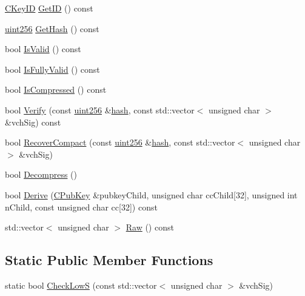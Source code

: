\begin{DoxyCompactItemize}
\item 
\hyperlink{class_c_key_i_d}{C\+Key\+I\+D} \hyperlink{class_c_pub_key_a9c1908fef34fd9e1c4b5e0ffd5d3834e}{Get\+I\+D} () const 
\item 
\hyperlink{classuint256}{uint256} \hyperlink{class_c_pub_key_a85b5eaf92b26cb4a230586050285c3f4}{Get\+Hash} () const 
\item 
bool \hyperlink{class_c_pub_key_aad6f369d7972f2244466ca6db900c2a4}{Is\+Valid} () const 
\item 
bool \hyperlink{class_c_pub_key_a2533ec5fc9a1c3d2ef39d0faa3ad6cdd}{Is\+Fully\+Valid} () const 
\item 
bool \hyperlink{class_c_pub_key_a397e437d9d0a008e2641892147b0931a}{Is\+Compressed} () const 
\item 
bool \hyperlink{class_c_pub_key_ab4047c7ce31b72591d8108a2563cd21b}{Verify} (const \hyperlink{classuint256}{uint256} \&\hyperlink{cache_8cc_a11ecb029164e055f28f4123ce3748862}{hash}, const std\+::vector$<$ unsigned char $>$ \&vch\+Sig) const 
\item 
bool \hyperlink{class_c_pub_key_a169505e735a02db385486b0affeb565c}{Recover\+Compact} (const \hyperlink{classuint256}{uint256} \&\hyperlink{cache_8cc_a11ecb029164e055f28f4123ce3748862}{hash}, const std\+::vector$<$ unsigned char $>$ \&vch\+Sig)
\item 
bool \hyperlink{class_c_pub_key_a572689418fecf47b300a11519bc3da36}{Decompress} ()
\item 
bool \hyperlink{class_c_pub_key_a182298237bb189abfe006e2ff3350acc}{Derive} (\hyperlink{class_c_pub_key}{C\+Pub\+Key} \&pubkey\+Child, unsigned char cc\+Child\mbox{[}32\mbox{]}, unsigned int n\+Child, const unsigned char cc\mbox{[}32\mbox{]}) const 
\item 
std\+::vector$<$ unsigned char $>$ \hyperlink{class_c_pub_key_a84463c7b02b9fa123c11470865180402}{Raw} () const 
\end{DoxyCompactItemize}
\subsection*{Static Public Member Functions}
\begin{DoxyCompactItemize}
\item 
static bool \hyperlink{class_c_pub_key_a4ada230ef593456ef9088c28fd5ca34e}{Check\+Low\+S} (const std\+::vector$<$ unsigned char $>$ \&vch\+Sig)
\end{DoxyCompactItemize}

